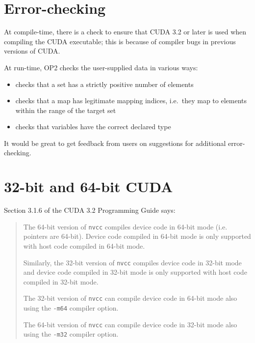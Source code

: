 \documentclass[11pt]{article}
\begin{document}


\section{Error-checking}

At compile-time, there is a check to ensure that CUDA 3.2 or later is used
when compiling the CUDA executable; this is because of compiler bugs in previous
versions of CUDA.

At run-time, OP2 checks the user-supplied data in various ways:
\begin{itemize}
\item
checks that a set has a strictly positive number of elements
\item
checks that a map has legitimate mapping indices,
i.e.~they map to elements within the range of the target set
\item
checks that variables have the correct declared type
\end{itemize}



It would be great to get feedback from users on suggestions for
additional error-checking.


\newpage
\section{32-bit and 64-bit CUDA}

Section 3.1.6 of the CUDA 3.2 Programming Guide says:
\begin{quotation}
The 64-bit version of {\tt nvcc} compiles device code in 64-bit mode
(i.e. pointers are 64-bit). Device code compiled in 64-bit mode
is only supported with host code compiled in 64-bit mode.

Similarly, the 32-bit version of {\tt nvcc} compiles device code in
32-bit mode and device code compiled in 32-bit mode is only
supported with host code compiled in 32-bit mode.

The 32-bit version of {\tt nvcc} can compile device code in 64-bit mode
also using the {\tt -m64} compiler option.

The 64-bit version of {\tt nvcc} can compile device code in 32-bit mode
also using the {\tt -m32} compiler option.
\end{quotation}
\end{document}

